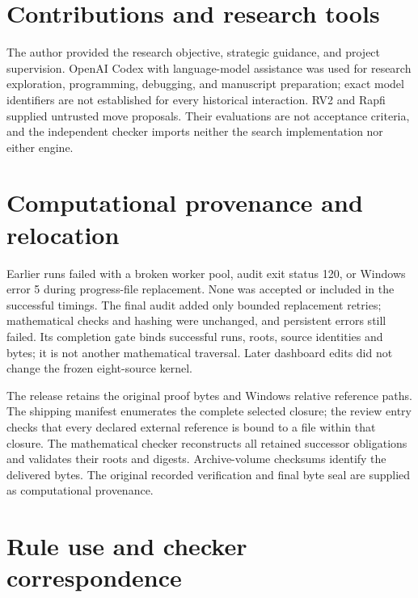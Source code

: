 \documentclass[11pt]{article}
\theoremstyle{definition}
\theoremstyle{remark}
\begin{document}
\section{Contributions and research tools}
The author provided the research objective, strategic guidance, and project
supervision. OpenAI Codex with language-model assistance was used for
research exploration, programming, debugging, and manuscript preparation;
exact model identifiers are not established for every historical interaction.
RV2 and Rapfi supplied untrusted move proposals. Their evaluations are not
acceptance criteria, and the independent checker imports neither the search
implementation nor either engine.


\section{Computational provenance and relocation}
\label{app:provenance}
Earlier runs failed with a broken worker pool, audit exit status 120, or
Windows error 5 during progress-file replacement. None was accepted or
included in the successful timings. The final audit added only bounded
replacement retries; mathematical checks and hashing were unchanged, and
persistent errors still failed. Its completion gate binds successful runs,
roots, source identities and bytes; it is not another mathematical traversal.
Later dashboard edits did not change the frozen eight-source kernel.

The release retains the original proof bytes and Windows relative reference
paths. The shipping manifest enumerates the complete selected closure;
the review entry checks that every declared external reference is bound to
a file within that closure. The mathematical checker reconstructs all
retained successor obligations and validates their roots and digests.
Archive-volume checksums identify the delivered bytes. The original recorded
verification and final byte seal are supplied as computational provenance.


\section{Rule use and checker correspondence}
\label{app:rule-use}
\end{document}
